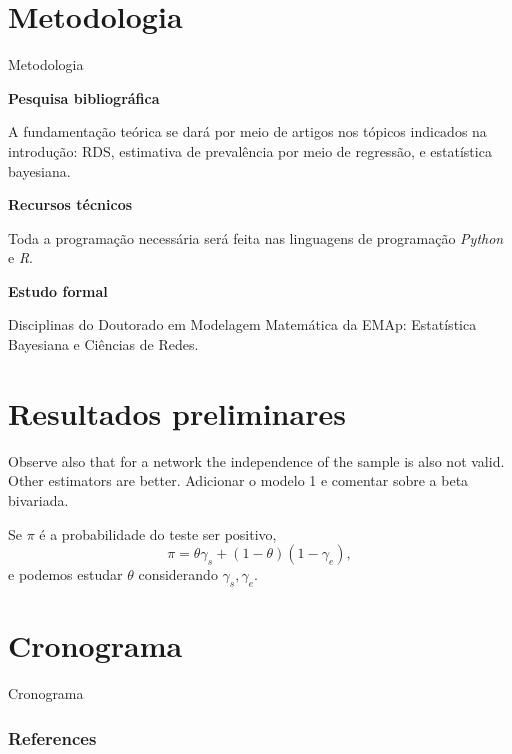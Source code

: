 \documentclass{beamer}
\newcommand{\Space}{\vspace{3ex}}
\begin{document}


\section{Metodologia}


\begin{frame}{Metodologia}

{\bf Pesquisa bibliográfica}

A fundamentação teórica se dará por meio de artigos nos tópicos indicados na
introdução: RDS, estimativa de prevalência por meio de
regressão, e estatística bayesiana. 

\Space

{\bf Recursos técnicos}

Toda a programação necessária será feita nas linguagens de programação \textit{Python} e \textit{R}. 

\Space

{\bf Estudo formal}

Disciplinas do Doutorado em Modelagem Matemática da EMAp: Estatística Bayesiana e Ciências de Redes.

\end{frame}


\section{Resultados preliminares}


\begin{frame}
  
  Observe also that for a network the independence of the sample is
  also not valid. Other estimators are better. Adicionar o modelo 1 e comentar
  sobre a beta bivariada.
  
  Se $\pi$ é a probabilidade do teste ser positivo,
  $$
  \pi = \theta\gamma_s + (1-\theta)(1-\gamma_e),
  $$
  e podemos estudar $\theta$ considerando $\gamma_s, \gamma_e$. 

\end{frame}


\section{Cronograma}

\begin{frame}{Cronograma}
  
\end{frame}


\begin{frame}[t, allowframebreaks]
   \frametitle{References}
   
   
 \end{frame}
\end{document}
